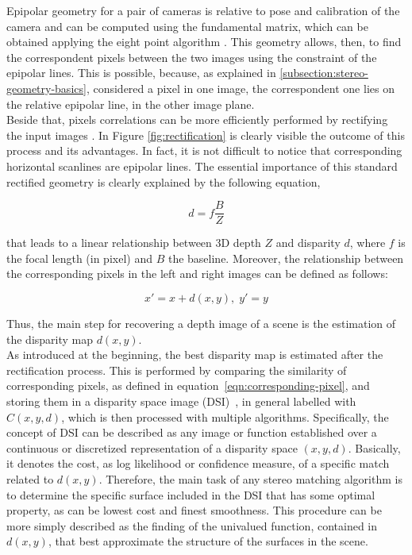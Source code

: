 Epipolar geometry for a pair of cameras is relative to pose and calibration of the camera and can be computed using the fundamental matrix, which can be obtained applying the eight point algorithm \cite{hartley2004multiple}.
This geometry allows, then, to find the correspondent pixels between the two images using the constraint of the epipolar lines.
This is possible, because, as explained in \ref{subsection:stereo-geometry-basics}, considered a pixel in one image, the correspondent one lies on the relative epipolar line, in the other image plane.\\
Beside that, pixels correlations can be more efficiently performed by rectifying the input images \cite{hartley2004multiple}.
In Figure \ref{fig:rectification} is clearly visible the outcome of this process and its advantages.
In fact, it is not difficult to notice that corresponding horizontal scanlines are epipolar lines. 
The essential importance of this standard rectified geometry is clearly explained by the following equation,

\begin{equation} 
\label{eqn:disparity-depth}
	d = f \frac{B}{Z}
\end{equation}

that leads to a linear relationship between 3D depth $Z$ and disparity $d$, where $f$ is the focal length (in pixel) and $B$ the baseline.
Moreover, the relationship between the corresponding pixels in the left and right images can be defined as follows:

\begin{equation} 
\label{eqn:corresponding-pixel}
	x' = x + d(x, y), \; y' = y
\end{equation}

Thus, the main step for recovering a depth image of a scene is the estimation of the disparity map $d(x,y)$.\\
As introduced at the beginning, the best disparity map is estimated after the rectification process. 
This is performed by comparing the similarity of corresponding pixels, as defined in equation~\ref{eqn:corresponding-pixel}, and storing them in a disparity space image (DSI)~\cite{yang1993local}, in general labelled with $C(x,y,d)$, which is then processed with multiple algorithms. 
Specifically, the concept of DSI can be described as any image or function established over a continuous or discretized representation of a disparity space $(x, y, d)$.
Basically, it denotes the cost, as log likelihood or confidence measure, of a specific match related to $d(x, y)$.
Therefore, the main task of any stereo matching algorithm is to determine the specific surface included in the DSI that has some optimal property, as can be lowest cost and finest smoothness.
This procedure can be more simply described as the finding of the univalued function, contained in $d(x, y)$, that best approximate the structure of the surfaces in the scene.


